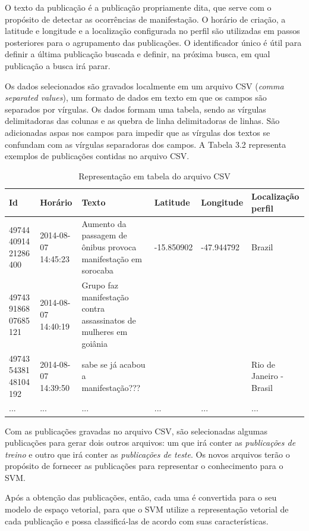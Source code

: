 O texto da publicação é a publicação propriamente dita, que serve com o propósito de detectar as ocorrências de manifestação. O horário de criação, a latitude e longitude e a localização configurada no perfil são utilizadas em passos posteriores para o agrupamento das publicações. O identificador único é útil para definir a última publicação buscada e definir, na próxima busca, em qual publicação a busca irá parar.

Os dados selecionados são gravados localmente em um arquivo CSV (\textit{comma separated values}), um formato de dados em texto em que os campos são separados por vírgulas. Os dados formam uma tabela, sendo as vírgulas delimitadoras das colunas e as quebra de linha delimitadoras de linhas. São adicionadas aspas nos campos para impedir que as vírgulas dos textos se confundam com as vírgulas separadoras dos campos. A Tabela 3.2 representa exemplos de publicações contidas no arquivo CSV.

\begin{table}[ht]
	\caption{Representação em tabela do arquivo CSV}
	\centering
	\begin{tabular}{| p{1cm} | p{2cm} | p{4cm} | p{2cm} | p{2cm} | p{2.5cm} |}
		\hline
		\textbf{Id} & \textbf{Horário} & \textbf{Texto} & \textbf{Latitude} &\textbf{Longitude} & \textbf{Localização perfil} \\ [0.5ex] \hline \hline
    49744 40914 21286 400 & 2014-08-07 14:45:23 & Aumento da passagem de ônibus provoca manifestação em sorocaba & -15.850902 & -47.944792 & Brazil \\ \hline
    49743 91868 07685 121 & 2014-08-07 14:40:19 & Grupo faz manifestação contra assassinatos de mulheres em goiânia &  &  &  \\ \hline
    49743 54381 48104 192 & 2014-08-07 14:39:50 & sabe se já acabou a manifestação??? &  &  & Rio de Janeiro - Brasil \\
    ... & ... & ... & ... & ... & ... \\
		\hline
	\end{tabular}
	\label{table:nonlin}
\end{table}

Com as publicações gravadas no arquivo CSV, são selecionadas algumas publicações para gerar dois outros arquivos: um que irá conter as \textit{publicações de treino} e outro que irá conter as \textit{publicações de teste}. Os novos arquivos terão o propósito de fornecer as publicações para representar o conhecimento para o SVM.

Após a obtenção das publicações, então, cada uma é convertida para o seu modelo de espaço vetorial, para que o SVM utilize a representação vetorial de cada publicação e possa classificá-las de acordo com suas características.

